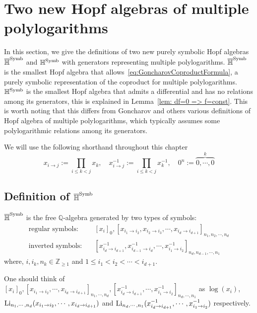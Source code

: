 \section{Two new Hopf algebras of multiple polylogarithms}

In this section, we give the definitions of two new purely symbolic Hopf algebras $\overline{\mathbb H}^{\operatorname{Symb}}$ and $\mathbb H^{\operatorname{Symb}}$ with generators representing multiple polylogarithms. $\overline{\mathbb H}^{\operatorname{Symb}}$ is the smallest Hopf algebra that allows~\eqref{eq:GoncharovCoproductFormula}, a purely symbolic representation of the coproduct for multiple polylogarithms. $\mathbb H^{\operatorname{Symb}}$ is the smallest Hopf algebra that admits a differential and has no relations among its generators, this is explained in Lemma~\ref{lem: df=0 => f=const}. This is worth noting that this differs from Goncharov and others various definitions of Hopf algebra of multiple polylogarithms, which typically assumes some polylogarithmic relations among its generators.

We will use the following shorthand throughout this chapter
\[
x_{i\to j}:=\prod_{i\leq k<j}x_k,\quad x^{-1}_{i\to j}:=\prod_{i\leq k<j}x_k^{-1},\quad 0^n:=\overbrace{0,\cdots,0}^k
\]

\subsection{Definition of $\overline{\mathbb H}^{\operatorname{Symb}}$}

\begin{definition}
$\overline{\mathbb H}^{\operatorname{Symb}}$ is the free $\mathbb Q$-algebra generated by two types of symbols:
\begin{align*}
\text{regular symbols:}&\quad [x_{i}]_0, [x_{i_1\to i_2}, x_{i_2\to i_3},\cdots,x_{i_d\to i_{d+1}}]_{n_1,n_2,\cdots,n_d}\\
\text{inverted symbols:}&\quad [x_{i_d\to i_{d+1}}^{-1},x_{i_{d-1}\to i_{d}}^{-1},\cdots,x_{i_1\to i_2}^{-1}]_{n_d,n_{d-1},\cdots,n_1}
\end{align*}
where, $i,i_k, n_k\in\mathbb Z_{\geq1}$ and $1\leq i_1<i_2<\cdots<i_{d+1}$.
\end{definition}

One should think of $[x_{i}]_0, [x_{i_1\to i_2},\cdots,x_{i_d\to i_{d+1}}]_{n_1,\cdots,n_d}, [x_{i_d\to i_{d+1}}^{-1},\cdots,x_{i_1\to i_2}^{-1}]_{n_d,\cdots,n_1}$ as $\log(x_i)$, $\operatorname{Li}_{n_1,\cdots,n_d}(x_{i_1\to i_2},\cdots,x_{i_d\to i_{d+1}})$ and $\operatorname{Li}_{n_d,\cdots,n_1}(x_{i_d\to i_{d+1}}^{-1},\cdots,x_{i_1\to i_2}^{-1})$ respectively.

